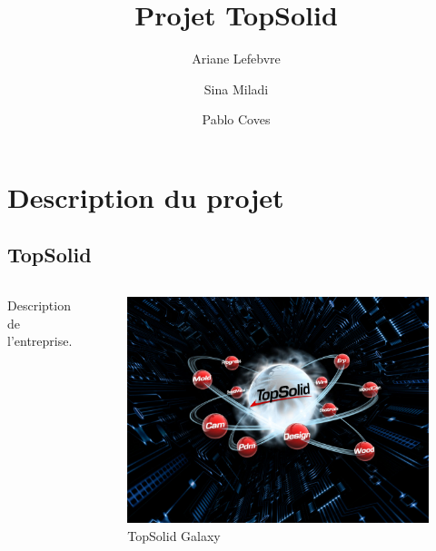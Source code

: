 \documentclass{beamer}
\title{Projet TopSolid}
\author{Ariane Lefebvre \and Sina Miladi \and Pablo Coves}
\date{}
\begin{document}
\maketitle

\section{Description du projet}
\subsection{TopSolid}
\begin{frame}
    \begin{columns}
        Description de l'entreprise.
        \begin{figure}
            \includegraphics[width=\textwidth]{img/topSolid.jpg}
            \caption{TopSolid Galaxy}
            \label{TopSolid}
        \end{figure}
    \end{columns}
\end{frame}
\end{document}
